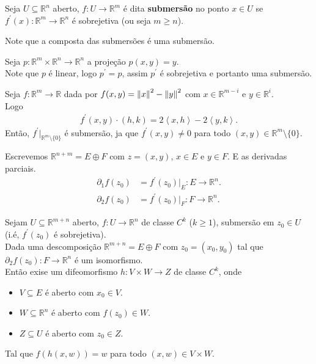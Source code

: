 \begin{definition}[Submersão]
  Seja $U\subseteq \mathbb{R}^{n}$ aberto, $f:U\to\mathbb{R}^{m}$ é dita \textbf{submersão} no ponto $x\in U$ se $f^{\prime}(x):\mathbb{R}^{m}\to\mathbb{R}^{n}$ é sobrejetiva (ou seja $m\geq n$). 
\end{definition}
\begin{note}
  Note que a composta das submersões é uma submersão.
\end{note}
\begin{example}
  Seja $p:\mathbb{R}^{m}\times\mathbb{R}^{n}\to\mathbb{R}^{n}$ a projeção $p(x,y)=y$.\\
  Note que $p$ é linear, logo $p^{\prime}=p$, assim $p^{\prime}$ é sobrejetiva e portanto uma submersão. 
\end{example}
\begin{example}
  Seja $f:\mathbb{R}^{m}\to\mathbb{R}$ dada por $f(x,y)=\left\|x\right\|^{2}-\left\|y\right\|^{2}$ com $x\in\mathbb{R}^{m-i}$ e $y\in\mathbb{R}^{i}$.\\
  Logo
  \begin{align*}
    f^{\prime}(x,y)\cdot (h,k)=2\left\langle x,h \right\rangle-2\left\langle y,k \right\rangle.
  \end{align*}
  Então, $f^{\prime}\big|_{\mathbb{R}^{m}\setminus\{0\}}$ é submersão, ja que $f^{\prime}(x,y)\neq 0$ para todo $(x,y)\in\mathbb{R}^{m}\setminus\{0\}$. 
\end{example}
\begin{notation}
  Escrevemos $\mathbb{R}^{n+m}=E\oplus F$ com $z=(x,y)$, $x\in E$ e $y\in F$. E as derivadas parciais.
  \begin{align*}
    \partial_{1}f(z_0)&=f^{\prime}(z_0)\big|_{E}:E\to\mathbb{R}^{n}.\\
    \partial_{2}f(z_0)&=f^{\prime}(z_0)\big|_{F}:F\to\mathbb{R}^{n}.
  \end{align*}
\end{notation}
\begin{theorem}
  Sejam $U\subseteq\mathbb{R}^{m+n}$ aberto, $f:U\to\mathbb{R}^{n}$ de classe $C^{k}$ ($k\geq 1$), submersão em $z_0\in U$ (i.é, $f^{\prime}(z_0)$ é sobrejetiva).\\
  Dada uma descomposição $\mathbb{R}^{m+n}=E\oplus F$ com $z_0=(x_0,y_0)$ tal que $\partial_{2}f(z_0):F\to\mathbb{R}^{n}$ é um isomorfismo.\\
  Então exise um difeomorfismo $h:V\times W\to Z$ de classe $C^{k}$, onde
  \begin{itemize}
    \item $V\subseteq E$ é aberto com $x_0\in V$.
    \item $W\subseteq \mathbb{R}^{n}$ é aberto com $f(z_0)\in W$.
    \item $Z\subseteq U$ é aberto com $z_0\in Z$. 
  \end{itemize}
  Tal que $f(h(x,w))=w$ para todo $(x,w)\in V\times W$. 
\end{theorem}
